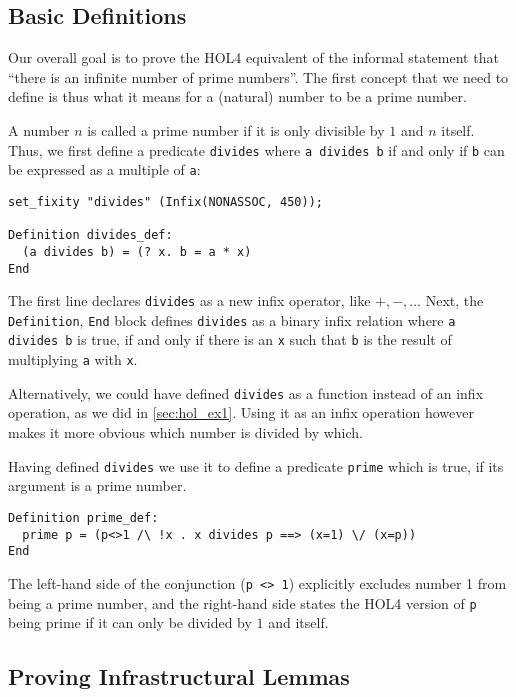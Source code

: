 \subsection{Basic Definitions}
Our overall goal is to prove the HOL4 equivalent of the informal statement that
``there is an infinite number of prime numbers''.
The first concept that we need to define is thus what it means for a (natural)
number to be a prime number.

A number $n$ is called a prime number if it is only divisible by $1$ and $n$
itself. Thus, we first define a predicate \lstinline{divides} where
\lstinline{a divides b} if and only if \lstinline{b} can be expressed as a
multiple of \lstinline{a}:

\begin{lstlisting}
set_fixity "divides" (Infix(NONASSOC, 450));

Definition divides_def:
  (a divides b) = (? x. b = a * x)
End
\end{lstlisting}
The first line declares \lstinline{divides} as a new infix operator, like $+,-, \ldots$
Next, the \lstinline{Definition}, \lstinline{End} block defines \lstinline{divides} as a
binary infix relation where \lstinline{a divides b} is true, if and only if
there is an \lstinline{x} such that \lstinline{b} is the result of multiplying \lstinline{a} with \lstinline{x}.

Alternatively, we could have defined \lstinline{divides} as a function instead
of an infix operation, as we did in \autoref{sec:hol_ex1}.
Using it as an infix operation however makes it more obvious which number is
divided by which.

Having defined \lstinline{divides} we use it to define a predicate
\lstinline{prime} which is true, if its argument is a prime number.
\begin{lstlisting}
Definition prime_def:
  prime p = (p<>1 /\ !x . x divides p ==> (x=1) \/ (x=p))
End
\end{lstlisting}

The left-hand side of the conjunction (\lstinline{p <> 1}) explicitly excludes
number 1 from being a prime number, and the right-hand side states the HOL4
version of \lstinline{p} being prime if it can only be divided by $1$ and itself.

\subsection{Proving Infrastructural Lemmas}

